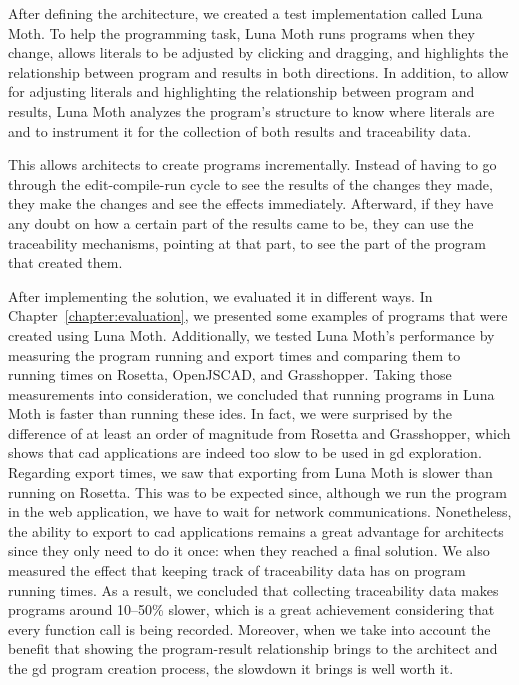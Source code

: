 After defining the architecture, we created a test implementation called Luna Moth.
To help the programming task, Luna Moth runs programs when they change, allows literals to be adjusted by clicking and dragging, and highlights the relationship between program and results in both directions.
In addition, to allow for adjusting literals and highlighting the relationship between program and results, Luna Moth analyzes the program's structure to know where literals are and to instrument it for the collection of both results and traceability data.

This allows architects to create programs incrementally.
Instead of having to go through the edit-compile-run cycle to see the results of the changes they made, they make the changes and see the effects immediately.
Afterward, if they have any doubt on how a certain part of the results came to be, they can use the traceability mechanisms, pointing at that part, to see the part of the program that created them.

After implementing the solution, we evaluated it in different ways.
In Chapter~\ref{chapter:evaluation}, we presented some examples of programs that were created using Luna Moth.
Additionally, we tested Luna Moth's performance by measuring the program running and export times and comparing them to running times on Rosetta, OpenJSCAD, and Grasshopper.
Taking those measurements into consideration, we concluded that running programs in Luna Moth is faster than running these \glspl{ide}.
In fact, we were surprised by the difference of at least an order of magnitude from Rosetta and Grasshopper, which shows that \gls{cad} applications are indeed too slow to be used in \gls{gd} exploration.
Regarding export times, we saw that exporting from Luna Moth is slower than running on Rosetta.
This was to be expected since, although we run the program in the web application, we have to wait for network communications.
Nonetheless, the ability to export to \gls{cad} applications remains a great advantage for architects since they only need to do it once: when they reached a final solution.
We also measured the effect that keeping track of traceability data has on program running times.
As a result, we concluded that collecting traceability data makes programs around 10--50\% slower, which is a great achievement considering that every function call is being recorded.
Moreover, when we take into account the benefit that showing the program-result relationship brings to the architect and the \gls{gd} program creation process, the slowdown it brings is well worth it.

